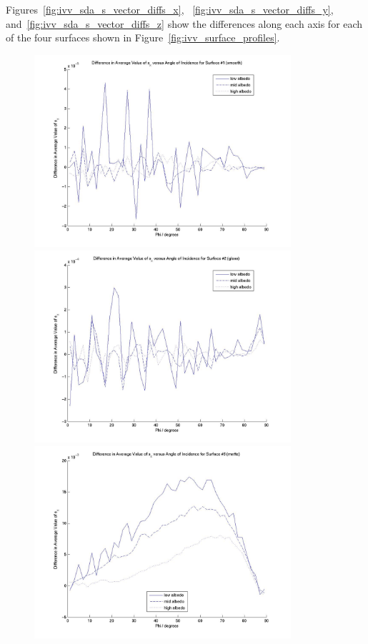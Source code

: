 \begin{description}
      Figures~\ref{fig:ivv_sda_s_vector_diffs_x},
      ~\ref{fig:ivv_sda_s_vector_diffs_y},
      and~\ref{fig:ivv_sda_s_vector_diffs_z} show the differences
      along each axis for each of the four surfaces shown in
      Figure~\ref{fig:ivv_surface_profiles}.

      \begin{figure}[!ht]
        \includegraphics[width=95mm]{figs/sda/unit_vec_diff__x_smooth.jpg}
        \includegraphics[width=95mm]{figs/sda/unit_vec_diff__x__gloss.jpg}
        \includegraphics[width=95mm]{figs/sda/unit_vec_diff__x__matte.jpg}

\end{figure}
\end{description}
